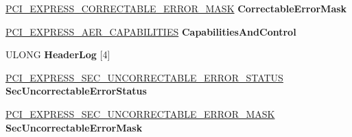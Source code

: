 \begin{DoxyCompactItemize}
\item 
\mbox{\label{struct___p_c_i___e_x_p_r_e_s_s___b_r_i_d_g_e___a_e_r___c_a_p_a_b_i_l_i_t_y_a8b7ac87dc1f264748a6ef29e0fece6db}} 
\hyperlink{union___p_c_i___e_x_p_r_e_s_s___c_o_r_r_e_c_t_a_b_l_e___e_r_r_o_r___m_a_s_k}{P\+C\+I\+\_\+\+E\+X\+P\+R\+E\+S\+S\+\_\+\+C\+O\+R\+R\+E\+C\+T\+A\+B\+L\+E\+\_\+\+E\+R\+R\+O\+R\+\_\+\+M\+A\+SK} {\bfseries Correctable\+Error\+Mask}
\item 
\mbox{\label{struct___p_c_i___e_x_p_r_e_s_s___b_r_i_d_g_e___a_e_r___c_a_p_a_b_i_l_i_t_y_aeab4c695ca06f5e0b825a43babba820c}} 
\hyperlink{union___p_c_i___e_x_p_r_e_s_s___a_e_r___c_a_p_a_b_i_l_i_t_i_e_s}{P\+C\+I\+\_\+\+E\+X\+P\+R\+E\+S\+S\+\_\+\+A\+E\+R\+\_\+\+C\+A\+P\+A\+B\+I\+L\+I\+T\+I\+ES} {\bfseries Capabilities\+And\+Control}
\item 
\mbox{\label{struct___p_c_i___e_x_p_r_e_s_s___b_r_i_d_g_e___a_e_r___c_a_p_a_b_i_l_i_t_y_a157bcc9587764f32052f24c0f0232968}} 
U\+L\+O\+NG {\bfseries Header\+Log} \mbox{[}4\mbox{]}
\item 
\mbox{\label{struct___p_c_i___e_x_p_r_e_s_s___b_r_i_d_g_e___a_e_r___c_a_p_a_b_i_l_i_t_y_a9c82f3632aed0502e165f9b2989a1255}} 
\hyperlink{union___p_c_i___e_x_p_r_e_s_s___s_e_c___u_n_c_o_r_r_e_c_t_a_b_l_e___e_r_r_o_r___s_t_a_t_u_s}{P\+C\+I\+\_\+\+E\+X\+P\+R\+E\+S\+S\+\_\+\+S\+E\+C\+\_\+\+U\+N\+C\+O\+R\+R\+E\+C\+T\+A\+B\+L\+E\+\_\+\+E\+R\+R\+O\+R\+\_\+\+S\+T\+A\+T\+US} {\bfseries Sec\+Uncorrectable\+Error\+Status}
\item 
\mbox{\label{struct___p_c_i___e_x_p_r_e_s_s___b_r_i_d_g_e___a_e_r___c_a_p_a_b_i_l_i_t_y_a2321a93b32908df68665c92eda2b184a}} 
\hyperlink{union___p_c_i___e_x_p_r_e_s_s___s_e_c___u_n_c_o_r_r_e_c_t_a_b_l_e___e_r_r_o_r___m_a_s_k}{P\+C\+I\+\_\+\+E\+X\+P\+R\+E\+S\+S\+\_\+\+S\+E\+C\+\_\+\+U\+N\+C\+O\+R\+R\+E\+C\+T\+A\+B\+L\+E\+\_\+\+E\+R\+R\+O\+R\+\_\+\+M\+A\+SK} {\bfseries Sec\+Uncorrectable\+Error\+Mask}
\item 
\mbox{\label{struct___p_c_i___e_x_p_r_e_s_s___b_r_i_d_g_e___a_e_r___c_a_p_a_b_i_l_i_t_y_a17b6510089487869f4b2e5fc1f7424a7}} 

\end{DoxyCompactItemize}
